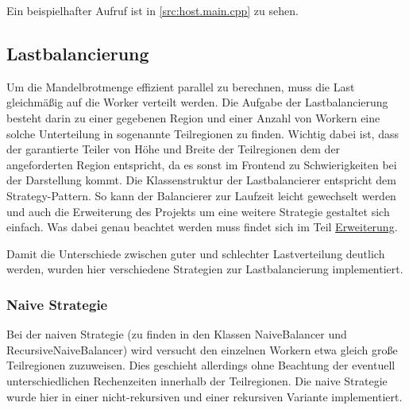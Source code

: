 Ein beispielhafter Aufruf ist in \autoref{src:host.main.cpp} zu sehen.

\begin{figure}
    
\end{figure}


\begin{figure}
    
\end{figure}

\subsection{Lastbalancierung}
Um die Mandelbrotmenge effizient parallel zu berechnen, muss die Last gleichmäßig auf die Worker verteilt werden.
Die Aufgabe der Lastbalancierung besteht darin zu einer gegebenen Region und einer Anzahl von Workern eine solche Unterteilung in sogenannte Teilregionen zu finden.
Wichtig dabei ist, dass der garantierte Teiler von Höhe und Breite der Teilregionen dem der angeforderten Region entspricht, da es sonst im Frontend zu Schwierigkeiten bei der Darstellung kommt.
Die Klassenstruktur der Lastbalancierer entspricht dem Strategy-Pattern. So kann der Balancierer zur Laufzeit leicht gewechselt werden und auch die Erweiterung des Projekts um eine weitere Strategie gestaltet sich einfach.
Was dabei genau beachtet werden muss findet sich im Teil \hyperref[lastbalancierung_erweiterung]{Erweiterung}.


Damit die Unterschiede zwischen guter und schlechter Lastverteilung deutlich werden, wurden hier verschiedene Strategien zur Lastbalancierung implementiert.

\subsubsection{Naive Strategie}

Bei der naiven Strategie (zu finden in den Klassen NaiveBalancer und RecursiveNaiveBalancer) wird versucht den einzelnen Workern etwa gleich große Teilregionen zuzuweisen.
Dies geschieht allerdings ohne Beachtung der eventuell unterschiedlichen Rechenzeiten innerhalb der Teilregionen.
Die naive Strategie wurde hier in einer nicht-rekursiven  und einer rekursiven Variante implementiert.

